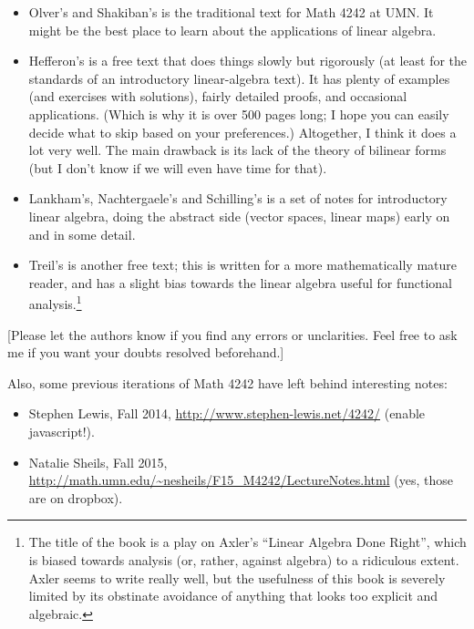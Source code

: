 \documentclass[numbers=enddot,12pt,final,onecolumn,notitlepage]{scrartcl}%
\theoremstyle{definition}
\begin{document}
\begin{itemize}
\item Olver's and Shakiban's \cite{OlvSha06} is the traditional text for Math
4242 at UMN. It might be the best place to learn about the applications of
linear algebra.

\item Hefferon's \cite{Heffer16} is a free text that does things slowly but
rigorously (at least for the standards of an introductory linear-algebra
text). It has plenty of examples (and exercises with solutions), fairly
detailed proofs, and occasional applications. (Which is why it is over 500
pages long; I hope you can easily decide what to skip based on your
preferences.) Altogether, I think it does a lot very well. The main drawback
is its lack of the theory of bilinear forms (but I don't know if we will even
have time for that).

\item Lankham's, Nachtergaele's and Schilling's \cite{LaNaSc16} is a set of
notes for introductory linear algebra, doing the abstract side (vector spaces,
linear maps) early on and in some detail.

\item Treil's \cite{Treil15} is another free text; this is written for a more
mathematically mature reader, and has a slight bias towards the linear algebra
useful for functional analysis.\footnote{The title of the book is a play on
Axler's \textquotedblleft Linear Algebra Done Right\textquotedblright, which
is biased towards analysis (or, rather, against algebra) to a ridiculous
extent. Axler seems to write really well, but the usefulness of this book is
severely limited by its obstinate avoidance of anything that looks too
explicit and algebraic.}
\end{itemize}

{\small [Please let the authors know if you find any errors or unclarities.
Feel free to ask me if you want your doubts resolved beforehand.]}

Also, some previous iterations of Math 4242 have left behind interesting notes:

\begin{itemize}
\item Stephen Lewis, Fall 2014, \url{http://www.stephen-lewis.net/4242/}
(enable javascript!).

\item Natalie Sheils, Fall 2015,
\url{http://math.umn.edu/~nesheils/F15_M4242/LectureNotes.html} (yes, those
are on dropbox).
\end{itemize}
\end{document}
